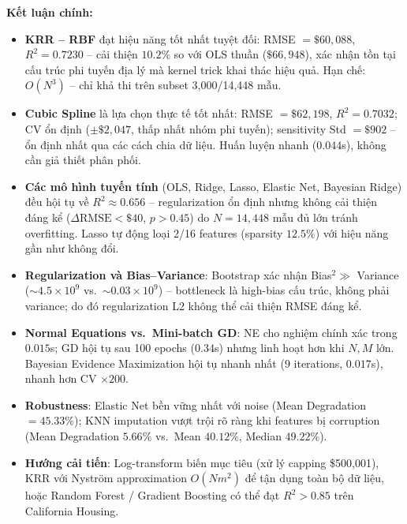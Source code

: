 \documentclass[12pt,a4paper]{article}
\begin{document}
\textbf{Kết luận chính:}
\begin{itemize}
  \item \textbf{KRR -- RBF} đạt hiệu năng tốt nhất tuyệt đối:
        RMSE $= \$60{,}088$, $R^2 = 0.7230$ -- cải thiện $10.2\%$ so
        với OLS thuần ($\$66{,}948$), xác nhận tồn tại cấu trúc phi
        tuyến địa lý mà kernel trick khai thác hiệu quả. Hạn chế:
        $O(N^3)$ -- chỉ khả thi trên subset 3{,}000/14{,}448 mẫu.

  \item \textbf{Cubic Spline} là lựa chọn thực tế tốt nhất:
        RMSE $= \$62{,}198$, $R^2 = 0.7032$; CV ổn định
        ($\pm\$2{,}047$, thấp nhất nhóm phi tuyến); sensitivity Std
        $= \$902$ -- ổn định nhất qua các cách chia dữ liệu.
        Huấn luyện nhanh ($0.044$s), không cần giả thiết phân phối.

  \item \textbf{Các mô hình tuyến tính} (OLS, Ridge, Lasso, Elastic Net,
        Bayesian Ridge) đều hội tụ về $R^2 \approx 0.656$ --
        regularization ổn định nhưng không cải thiện đáng kể
        ($\Delta\text{RMSE} < \$40$, $p > 0.45$) do $N = 14{,}448$
        mẫu đủ lớn tránh overfitting. Lasso tự động loại 2/16 features
        (sparsity $12.5\%$) với hiệu năng gần như không đổi.

  \item \textbf{Regularization và Bias--Variance}: Bootstrap xác nhận
        Bias$^2 \gg$ Variance ($\sim 4.5 \times 10^9$ vs.\
        $\sim 0.03 \times 10^9$) -- bottleneck là high-bias cấu trúc,
        không phải variance; do đó regularization L2 không thể cải
        thiện RMSE đáng kể.

  \item \textbf{Normal Equations vs.\ Mini-batch GD}:
        NE cho nghiệm chính xác trong $0.015$s; GD hội tụ sau 100 epochs
        ($0.34$s) nhưng linh hoạt hơn khi $N, M$ lớn.
        Bayesian Evidence Maximization hội tụ nhanh nhất (9 iterations,
        $0.017$s), nhanh hơn CV $\times 200$.

  \item \textbf{Robustness}: Elastic Net bền vững nhất với noise
        (Mean Degradation $= 45.33\%$); KNN imputation vượt trội rõ
        ràng khi features bị corruption (Mean Degradation $5.66\%$
        vs.\ Mean $40.12\%$, Median $49.22\%$).

  \item \textbf{Hướng cải tiến}: Log-transform biến mục tiêu (xử lý
        capping \$500{,}001), KRR với Nyström approximation $O(Nm^2)$
        để tận dụng toàn bộ dữ liệu, hoặc Random Forest / Gradient
        Boosting có thể đạt $R^2 > 0.85$ trên California Housing.
\end{itemize}
\end{document}
